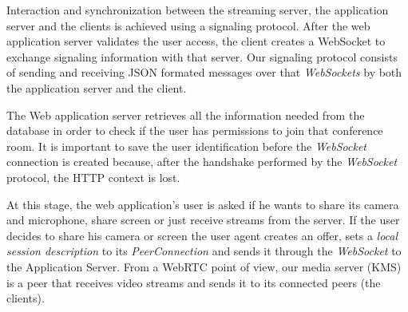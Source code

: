 \documentclass[10pt,conference]{IEEEtran}
\begin{document}
\begin{table}
\centering
	\caption{Application Architecture}
	\label{table:apparch}

\end{table}



Interaction and synchronization between the streaming server, the application server and the clients is achieved using a signaling protocol.
After the web application server validates the user access, the client creates a WebSocket to exchange signaling information with that server. 
Our signaling protocol consists of sending and receiving \gls{JSON} formated messages over that \emph{WebSockets} by both the application server and the client. 

The Web application server retrieves all the information needed from the database in order to check if the user has permissions to join that conference room. 
It is important to save the user identification before the \emph{WebSocket} connection is created because, after the handshake performed by the \emph{WebSocket} protocol\cite{rfc6455}, the \gls{HTTP} context is lost.

At this stage, the web application's user is asked if he wants to share its camera and microphone, share screen or just receive streams from the server. 
If the user decides to share his camera or screen the user agent creates an offer, sets a \emph{local session description} to its \emph{PeerConnection} and sends it through the \emph{WebSocket} to the Application Server.
From a \gls{WebRTC} point of view, our media server (\gls{KMS}) is a peer that receives video streams and sends it to its connected peers (the clients). 
\end{document}

